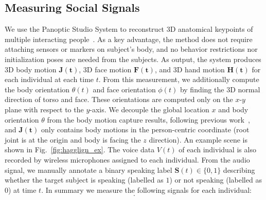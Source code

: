 \subsection{Measuring Social Signals}
We use the Panoptic Studio System to reconstruct 3D anatomical keypoints of multiple interacting people~\cite{joo2017panoptic, joo2018}. As a key advantage, the method does not require attaching sensors or markers on subject's body, and no behavior restrictions nor initialization poses are needed from the subjects. As output, the system produces 3D body motion $\mathbf{J(t)}$, 3D face motion $\mathbf{F(t)}$, and 3D hand motion $\mathbf{H(t)}$ for each individual at each time $t$. From this measurement, we additionally compute the body orientation $\theta(t)$ and face orientation $\phi(t)$ by finding the 3D normal direction of torso and face. These orientations are computed only on the $x$-$y$ plane with respect to the $y$-axis. We decouple the global location $x$ and body orientation $\theta$ from the body motion capture results, following previous work~\cite{jain2016structural, holden2016deep}, and $\mathbf{J(t)}$ only contains body motions in the person-centric coordinate (root joint is at the origin and body is facing the $z$ direction). An example scene is shown in Fig.~\ref{fig:hagglign_ex}. The voice data $V(t)$ of each individual is also recorded by wireless microphones assigned to each individual. From the audio signal, we manually annotate a binary speaking label $\mathbf{S}(t) \in \{0,1\}$ describing whether the target subject is speaking (labelled as $1$) or not speaking (labelled as $0$) at time $t$. In summary we measure the following signals for each individual:
\begin{equation}
[ \mathbf{x}, \boldsymbol{\theta}, \boldsymbol{\phi}, \mathbf{J}, \mathbf{F}, \mathbf{H}, \mathbf{V}, \mathbf{S} ].
\label{equation:measurement}
\end{equation}




